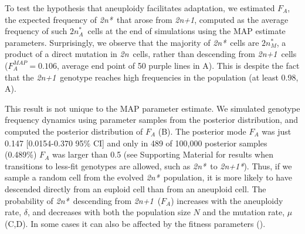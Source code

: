 \documentclass[12pt]{extarticle}
\newcommand{\euwt}{\emph{2n}}
\newcommand{\anwt}{\emph{2n+1}}
\newcommand{\eumt}{\emph{2n*}}
\newcommand{\eumtM}{\emph{$2n^*_M$}}
\newcommand{\eumtA}{\emph{$2n^*_A$}}
\newcommand{\anmt}{\emph{2n+1*}}
\begin{document}
To test the hypothesis that aneuploidy facilitates adaptation, we estimated $F_A$, the expected frequency of \eumt\ that arose from \anwt, computed as the average frequency of such \eumtA\ cells at the end of simulations using the MAP estimate parameters.
Surprisingly, we observe that the majority of \eumt\ cells are \eumtM, a product of a direct mutation in \euwt\ cells, rather than descending from \anwt\ cells ($F_A^{MAP} = 0.106$, average end point of 50 purple lines in A). 
This is despite the fact that the \anwt\ genotype reaches high frequencies in the population (at least 0.98, A).

This result is not unique to the MAP parameter estimate. 
We simulated genotype frequency dynamics using parameter samples from the posterior distribution, and computed the posterior distribution of $F_A$ (B). 
The posterior mode $F_A$ was just 0.147 [0.0154-0.370 95\% CI] and only in 489 of 100,000 posterior samples (0.489\%) $F_A$ was  larger than 0.5 (see Supporting Material for results when transitions to less-fit genotypes are allowed, such as \eumt\ to \anmt).  
Thus, if we sample a random cell from the evolved \eumt\ population, it is more likely to have descended directly from an euploid cell than from an aneuploid cell. 
The probability of \eumt\ descending from \anwt\ ($F_A$) increases with the aneuploidy rate, $\delta$, and decreases with both the population size $N$ and the mutation rate, $\mu$ (C,D). In some cases it can also be affected by the fitness parameters (). 

\end{document}
